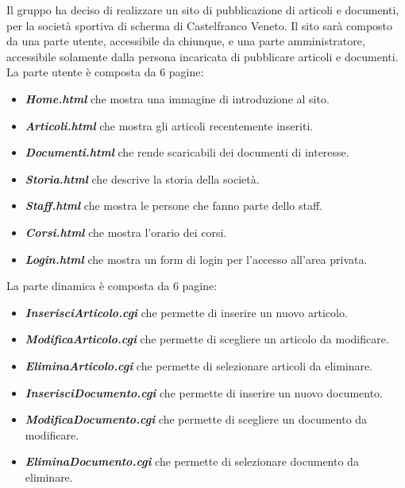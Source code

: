 Il gruppo ha deciso di realizzare un sito di pubblicazione di articoli e documenti, per la societ\`a sportiva di scherma di Castelfranco Veneto. Il sito sar\`a composto da una parte utente, accessibile da chiunque, e una parte amministratore, accessibile solamente dalla persona incaricata di pubblicare articoli e documenti. \\
La parte utente \`e composta da 6 pagine:
\begin{itemize}
	\item {\bfseries\textit{Home.html}} che mostra una immagine di introduzione al sito.
	\item {\bfseries\textit{Articoli.html}} che mostra gli articoli recentemente inseriti.
	\item {\bfseries\textit{Documenti.html}} che rende scaricabili dei documenti di interesse.
	\item {\bfseries\textit{Storia.html}} che descrive la storia della societ\`a.
	\item {\bfseries\textit{Staff.html}} che mostra le persone che fanno parte dello staff.
	\item {\bfseries\textit{Corsi.html}} che mostra l'orario dei corsi.
	\item {\bfseries\textit{Login.html}} che mostra un form di login per l'accesso all'area privata.
\end{itemize}
La parte dinamica \`e composta da 6 pagine:
\begin{itemize}
	\item {\bfseries\textit{InserisciArticolo.cgi}} che permette di inserire un nuovo articolo.
	\item {\bfseries\textit{ModificaArticolo.cgi}} che permette di scegliere un articolo da modificare.
	\item {\bfseries\textit{EliminaArticolo.cgi}} che permette di selezionare articoli da eliminare.
	\item {\bfseries\textit{InserisciDocumento.cgi}} che permette di inserire un nuovo documento.
	\item {\bfseries\textit{ModificaDocumento.cgi}} che permette di scegliere un documento da modificare.
	\item {\bfseries\textit{EliminaDocumento.cgi}} che permette di selezionare documento da eliminare.
\end{itemize}